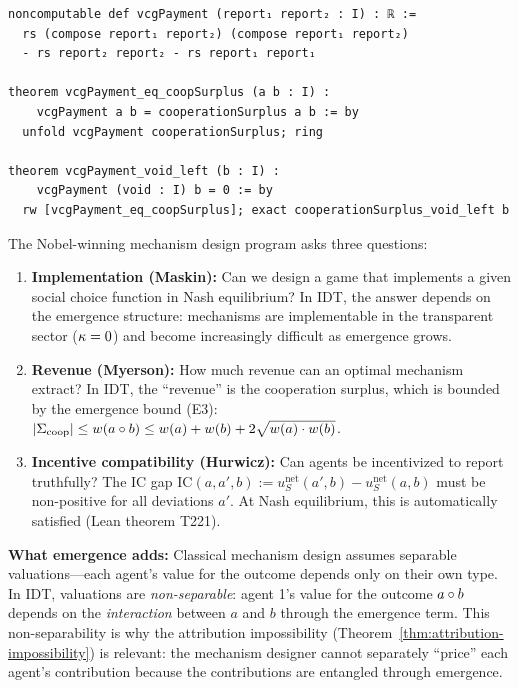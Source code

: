 \begin{lstlisting}[caption={Lean 4: VCG mechanism design}]
noncomputable def vcgPayment (report₁ report₂ : I) : ℝ :=
  rs (compose report₁ report₂) (compose report₁ report₂)
  - rs report₂ report₂ - rs report₁ report₁

theorem vcgPayment_eq_coopSurplus (a b : I) :
    vcgPayment a b = cooperationSurplus a b := by
  unfold vcgPayment cooperationSurplus; ring

theorem vcgPayment_void_left (b : I) :
    vcgPayment (void : I) b = 0 := by
  rw [vcgPayment_eq_coopSurplus]; exact cooperationSurplus_void_left b
\end{lstlisting}

\begin{interpretation}
The Nobel-winning mechanism design program asks three questions:
\begin{enumerate}
\item \textbf{Implementation (Maskin):} Can we design a game that
implements a given social choice function in Nash equilibrium?
In IDT, the answer depends on the emergence structure: mechanisms
are implementable in the transparent sector ($\kappa = 0$) and
become increasingly difficult as emergence grows.
\item \textbf{Revenue (Myerson):} How much revenue can an optimal
mechanism extract? In IDT, the ``revenue'' is the cooperation surplus,
which is bounded by the emergence bound (E3):
$|\Sigma_{\text{coop}}| \leq w(a \circ b) \leq w(a) + w(b) + 2\sqrt{w(a) \cdot w(b)}$.
\item \textbf{Incentive compatibility (Hurwicz):} Can agents be
incentivized to report truthfully? The IC gap
$\text{IC}(a, a', b) := u_S^{\text{net}}(a', b) - u_S^{\text{net}}(a, b)$
must be non-positive for all deviations $a'$. At Nash equilibrium,
this is automatically satisfied (Lean theorem T221).
\end{enumerate}

\textbf{What emergence adds:} Classical mechanism design assumes
separable valuations---each agent's value for the outcome depends only
on their own type. In IDT, valuations are \emph{non-separable}:
agent 1's value for the outcome $a \circ b$ depends on the
\emph{interaction} between $a$ and $b$ through the emergence term.
This non-separability is why the attribution impossibility
(Theorem~\ref{thm:attribution-impossibility}) is relevant: the
mechanism designer cannot separately ``price'' each agent's
contribution because the contributions are entangled through emergence.
\end{interpretation}


